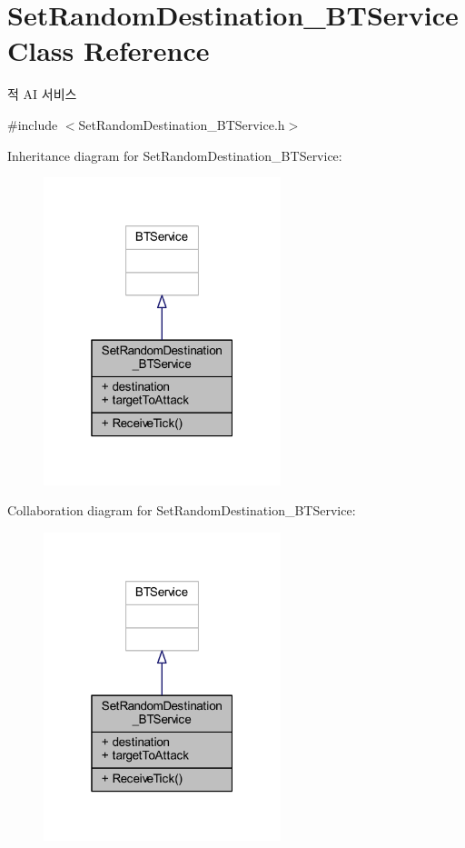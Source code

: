 \hypertarget{class_set_random_destination___b_t_service}{}\section{Set\+Random\+Destination\+\_\+\+B\+T\+Service Class Reference}
\label{class_set_random_destination___b_t_service}


적 AI 서비스  




{\ttfamily \#include $<$Set\+Random\+Destination\+\_\+\+B\+T\+Service.\+h$>$}



Inheritance diagram for Set\+Random\+Destination\+\_\+\+B\+T\+Service\+:
\nopagebreak
\begin{figure}[H]
\begin{center}
\leavevmode
\includegraphics[width=196pt]{class_set_random_destination___b_t_service__inherit__graph}
\end{center}
\end{figure}


Collaboration diagram for Set\+Random\+Destination\+\_\+\+B\+T\+Service\+:
\nopagebreak
\begin{figure}[H]
\begin{center}
\leavevmode
\includegraphics[width=196pt]{class_set_random_destination___b_t_service__coll__graph}
\end{center}
\end{figure}
